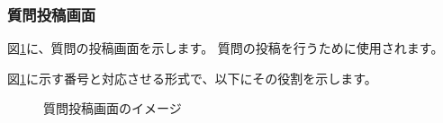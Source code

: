 \documentclass[a4j]{jarticle}
\begin{document}
\subsubsection{質問投稿画面}
図\ref{honjo_CR_Contribution}に、質問の投稿画面を示します。
質問の投稿を行うために使用されます。

図\ref{honjo_CR_Contribution}に示す番号と対応させる形式で、以下にその役割を示します。

\begin{figure}[H]
    \begin{center}
    \caption {質問投稿画面のイメージ}
    \label{honjo_CR_Contribution}
    \end{center}
\end{figure}
\end{document}
